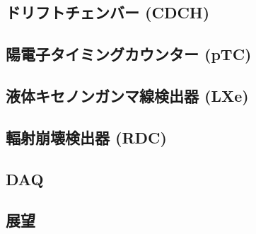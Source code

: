 \documentclass[Yonemoto_master.tex]{subfiles}
\begin{document}
\subsection{ドリフトチェンバー (CDCH)}
\subsection{陽電子タイミングカウンター (pTC)}
\subsection{液体キセノンガンマ線検出器 (LXe)}
\subsection{輻射崩壊検出器 (RDC)}
\subsection{DAQ}
\subsection{展望}
\end{document}
